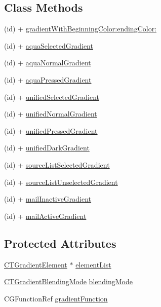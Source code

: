 \subsection*{Class Methods}
\begin{DoxyCompactItemize}
\item 
(id) + \hyperlink{interface_c_t_gradient_a1fb12387ffae0ed9752c57c2a8d0389f}{gradient\-With\-Beginning\-Color\-:ending\-Color\-:}
\item 
(id) + \hyperlink{interface_c_t_gradient_a77c8262b321c796386661ce800c14aab}{aqua\-Selected\-Gradient}
\item 
(id) + \hyperlink{interface_c_t_gradient_af040f8f2a80529bdd12100cc1db22b2c}{aqua\-Normal\-Gradient}
\item 
(id) + \hyperlink{interface_c_t_gradient_a34e707069baed1be5d8176c0526e868a}{aqua\-Pressed\-Gradient}
\item 
(id) + \hyperlink{interface_c_t_gradient_a1b1dc434dc37ab997f18e7665014bd8a}{unified\-Selected\-Gradient}
\item 
(id) + \hyperlink{interface_c_t_gradient_ae398a79c41906675f2325468144902fc}{unified\-Normal\-Gradient}
\item 
(id) + \hyperlink{interface_c_t_gradient_a2d183ca4c518c1c0ccfcfddcdddf9ecd}{unified\-Pressed\-Gradient}
\item 
(id) + \hyperlink{interface_c_t_gradient_a32b472e1bcb5425b1a358436b119b4be}{unified\-Dark\-Gradient}
\item 
(id) + \hyperlink{interface_c_t_gradient_a58e5634a2982b42f292955eb5adacac4}{source\-List\-Selected\-Gradient}
\item 
(id) + \hyperlink{interface_c_t_gradient_af5e4ddc5029fbcbc33f43e235ec2a76d}{source\-List\-Unselected\-Gradient}
\item 
(id) + \hyperlink{interface_c_t_gradient_a0e20ef7e868aad0bc45c58455b3a98ca}{mail\-Inactive\-Gradient}
\item 
(id) + \hyperlink{interface_c_t_gradient_a07b741863cb0097c013378b24e1f1669}{mail\-Active\-Gradient}
\end{DoxyCompactItemize}
\subsection*{Protected Attributes}
\begin{DoxyCompactItemize}
\item 
\hyperlink{_c_t_gradient_8h_a72305f763c1887d41821fe2382b8ae27}{C\-T\-Gradient\-Element} $\ast$ \hyperlink{interface_c_t_gradient_a8db6cbfa589be4e3099a9fcd6e058a21}{element\-List}
\item 
\hyperlink{_c_t_gradient_8h_ace00a9b95be98321b1032d647d97aa73}{C\-T\-Gradient\-Blending\-Mode} \hyperlink{interface_c_t_gradient_a127e94011d529bc38ad62c1d15da00d8}{blending\-Mode}
\item 
C\-G\-Function\-Ref \hyperlink{interface_c_t_gradient_aefa46bc529df92da17edb3a63a64c8eb}{gradient\-Function}
\end{DoxyCompactItemize}


